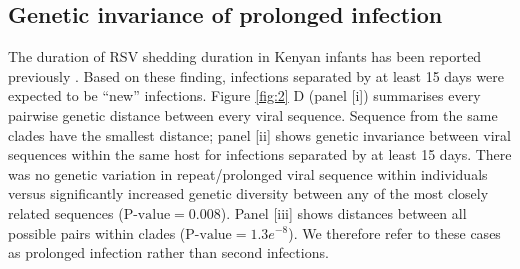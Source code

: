\documentclass{article} %
\begin{document}
\subsection{Genetic invariance of prolonged infection}
The duration of RSV shedding duration in Kenyan infants has been reported previously
\cite{okiro2010duration}.
Based on these finding, infections separated by at least 15 days were expected to be ``new'' infections. 
Figure \ref{fig:2} D (panel [i]) summarises every pairwise genetic distance between every viral sequence.
Sequence from the same clades have the smallest distance; panel [ii] shows genetic invariance between viral sequences within the same host for infections separated by at least 15 days. 
There was no genetic variation in repeat/prolonged viral sequence within individuals versus significantly increased genetic diversity between any of the most closely related sequences ($\text{P-value} = 0.008$).
Panel [iii] shows distances between all possible pairs within clades ($\text{P-value} = 1.3e^{-8}$).
We therefore refer to these cases as prolonged infection rather than second infections.
\end{document}
